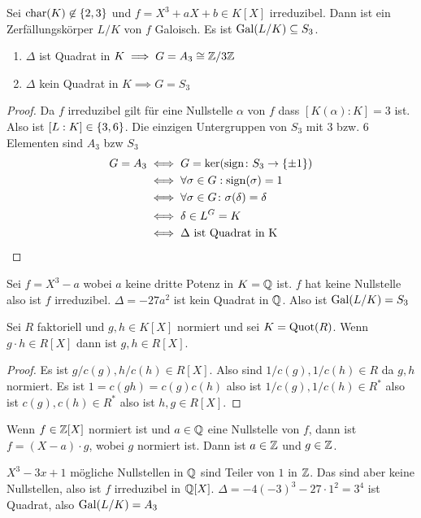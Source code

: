 \begin{Satz}
    Sei $\operatorname{char} (K)\not\in\{2,3\}$ und $f=X^3+aX+b\in K[X]$ irreduzibel. Dann ist ein Zerfällungskörper $L/K$ von $f$ Galoisch. Es ist $\operatorname{Gal}(L/K)\subseteq S_3$.
    \begin{enumerate}
        \item $\Delta$ ist Quadrat in $K\implies G=A_3\cong\mathbb{Z}/3\mathbb{Z}$
        \item $\Delta$ kein Quadrat in $K\implies G=S_3$
    \end{enumerate}
\end{Satz}
\begin{proof}
    Da $f$ irreduzibel gilt für eine Nullstelle $\alpha$ von $f$ dass $[K(\alpha):K]=3$ ist. Also ist $[L:K]\in\{3,6\}$.
    Die einzigen Untergruppen von $S_3$ mit 3 bzw. 6 Elementen sind $A_3$ bzw $S_3$
    \begin{align*}
        G=A_3&\iff G=\ker(\operatorname{sign}\colon S_3\to\{\pm 1\})\\
        &\iff \forall\sigma\in G: \operatorname{sign}(\sigma)=1\\
        &\iff \forall \sigma\in G\colon \sigma(\delta)=\delta\\
        &\iff \delta\in L^G=K\\
        &\iff \Delta \text{ ist Quadrat in K}
    \end{align*}
\end{proof}
\begin{Bsp}
    Sei $f=X^3-a$ wobei $a$  keine dritte Potenz in $K=\mathbb{Q}$ ist.
    $f$ hat keine Nullstelle also ist $f$ irreduzibel. $\Delta=-27a^2$ ist kein Quadrat in $\mathbb{Q}$. Also ist $\operatorname{Gal}(L/K)=S_3$
\end{Bsp}
\begin{Lemma}\label{Lem:RatNst}
    Sei $R$ faktoriell und $g,h\in K[X]$ normiert und sei $K=\operatorname{Quot}(R)$. Wenn $g\cdot h\in R[X]$ dann ist $g,h\in R[X]$.
\end{Lemma}
\begin{proof}
    Es ist $g/c(g), h/c(h)\in R[X]$. Also sind $1/c(g),1/c(h)\in R$ da $g,h$ normiert.
    Es ist $1=c(gh)=c(g)c(h)$ also ist $1/c(g),1/c(h)\in R^*$ also ist $c(g),c(h)\in R^*$ also ist $h,g\in R[X]$.
\end{proof}
\begin{Kor}
    Wenn $f\in\mathbb{Z}[X]$ normiert ist und $a\in\mathbb{Q}$ eine Nullstelle von $f$, dann ist $f=(X-a)\cdot g$, wobei $g$ normiert ist. Dann ist $a\in\mathbb{Z}$ und $g\in\mathbb{Z}$.
\end{Kor}
\begin{Bsp}
    $X^3-3x+1$ mögliche Nullstellen in $\mathbb{Q}$ sind Teiler von $1$ in $\mathbb{Z}$. Das sind aber keine Nullstellen, also ist $f$ irreduzibel in $\mathbb{Q}[X]$.
    $\Delta=-4(-3)^3-27\cdot 1^2=3^4$ ist Quadrat, also $\operatorname{Gal}(L/K)=A_3$
\end{Bsp}
